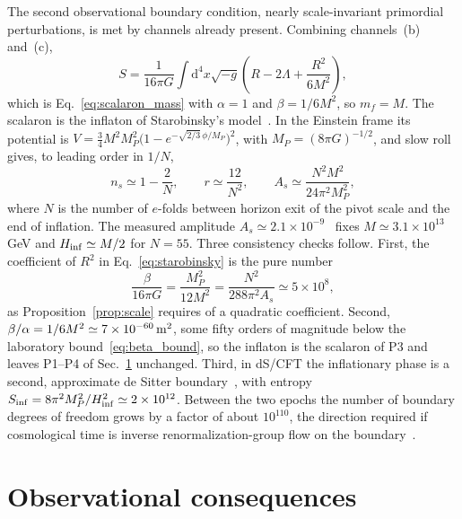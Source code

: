 \documentclass[reprint,aps,prd,amsmath,amssymb,superscriptaddress,nofootinbib,floatfix]{revtex4-2}
\theoremstyle{plain}
\theoremstyle{definition}
\theoremstyle{remark}
\newcommand{\dd}{\mathrm{d}}
\begin{document}
The second observational boundary condition, nearly scale-invariant primordial perturbations, is met by channels
already present. Combining channels~(b) and~(c),
\begin{equation}
S=\frac{1}{16\pi G}\int\dd^4x\sqrt{-g}\left(R-2\Lambda+\frac{R^2}{6M^2}\right),
\label{eq:starobinsky}
\end{equation}
which is Eq.~\eqref{eq:scalaron_mass} with $\alpha=1$ and $\beta=1/6M^2$, so $m_f=M$. The scalaron is the inflaton of Starobinsky's
model~\cite{Starobinsky1980,MukhanovChibisov1981}. In the Einstein frame its potential is
$V=\tfrac34M^2M_P^2\big(1-e^{-\sqrt{2/3}\,\phi/M_P}\big)^2$, with $M_P=(8\pi G)^{-1/2}$, and slow roll gives, to leading order in $1/N$,
\begin{equation}
n_s\simeq1-\frac2N,\qquad r\simeq\frac{12}{N^2},\qquad A_s\simeq\frac{N^2M^2}{24\pi^2M_P^2},
\label{eq:staro_obs}
\end{equation}
where $N$ is the number of $e$-folds between horizon exit of the pivot scale and the end of inflation. The measured
amplitude $A_s\simeq2.1\times10^{-9}$~\cite{Planck2018params} fixes $M\simeq3.1\times10^{13}$\,GeV and $H_{\rm inf}\simeq M/2$ for $N=55$. Three
consistency checks follow. First, the coefficient of $R^2$ in Eq.~\eqref{eq:starobinsky} is the pure number
\begin{equation}
\frac{\beta}{16\pi G}=\frac{M_P^2}{12M^2}=\frac{N^2}{288\pi^2A_s}\simeq5\times10^{8},
\label{eq:R2coef}
\end{equation}
as Proposition~\ref{prop:scale} requires of a quadratic coefficient. Second, $\beta/\alpha=1/6M^2\simeq7\times10^{-60}\,{\rm m}^2$, some fifty
orders of magnitude below the laboratory bound~\eqref{eq:beta_bound}, so the inflaton is the scalaron of P3 and leaves
P1--P4 of Sec.~\ref{sec:predictions} unchanged. Third, in dS/CFT the inflationary phase is a second, approximate de
Sitter boundary~\cite{Strominger2001b}, with entropy $S_{\rm inf}=8\pi^2M_P^2/H_{\rm inf}^2\simeq2\times10^{12}$. Between the two epochs the
number of boundary degrees of freedom grows by a factor of about $10^{110}$, the direction required if cosmological time
is inverse renormalization-group flow on the boundary~\cite{Strominger2001b}.

\section{Observational consequences}
\label{sec:predictions}
\end{document}
